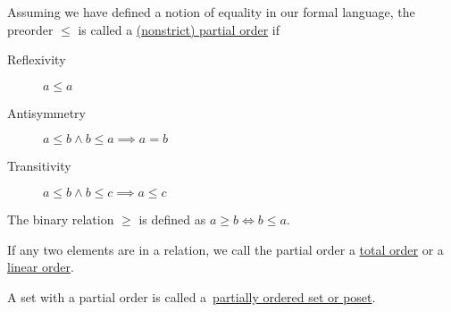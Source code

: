 \begin{definition}
\begin{defenum}
    \item\label{def:order/partial} Assuming we have defined a notion of equality in our formal language, the preorder $\leq$ is called a \uline{(nonstrict) partial order} if
    \begin{description}
      \item[Reflexivity] $a \leq a$
      \item[Antisymmetry] $a \leq b \land b \leq a \implies a = b$
      \item[Transitivity] $a \leq b \land b \leq c \implies a \leq c$
    \end{description}

    The binary relation $\geq$ is defined as $a \geq b \iff b \leq a$.

    If any two elements are in a relation, we call the partial order a \uline{total order} or a \uline{linear order}.

    A set with a partial order is called a~\uline{partially ordered set or poset}.
  \end{defenum}
\end{definition}
